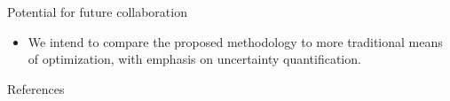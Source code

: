 \documentclass[final]{beamer}
\newlength{\onecolwid}
\begin{document}
\begin{frame}[t]
\begin{columns}[t]
\begin{column}{\onecolwid}
\begin{alertblock}{Potential for future collaboration}
\begin{itemize}
\item We intend to compare the proposed methodology to more traditional means of optimization, with emphasis on uncertainty quantification.
\end{itemize}

\end{alertblock}


%
%
%

\begin{alertblock}{References}
{
\tiny




}

\end{alertblock}




\end{column} %

\end{columns} %

\end{frame} %
\end{document}

